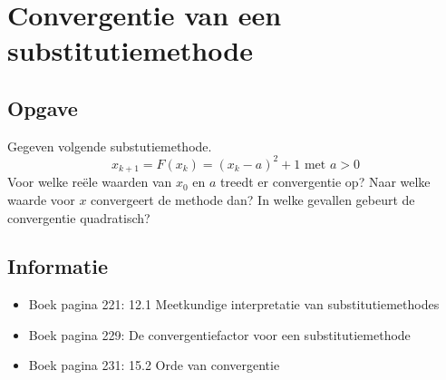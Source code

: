 \documentclass[examenvragen.tex]{subfiles}
\begin{document}
\section{Convergentie van een substitutiemethode}

\subsection{Opgave}
Gegeven volgende substutiemethode.
\[
x_{k+1} = F(x_{k}) = (x_{k}-a)^2+1 \text{ met } a>0
\]
Voor welke re\"ele waarden van $x_0$ en $a$ treedt er convergentie op? Naar welke waarde voor $x$ convergeert de methode dan?
In welke gevallen gebeurt de convergentie quadratisch?

\subsection{Informatie}
\begin{itemize}
\item Boek pagina 221: 12.1 Meetkundige interpretatie van substitutiemethodes
\item Boek pagina 229: De convergentiefactor voor een substitutiemethode
\item Boek pagina 231: 15.2 Orde van convergentie
\end{itemize}
\end{document}
